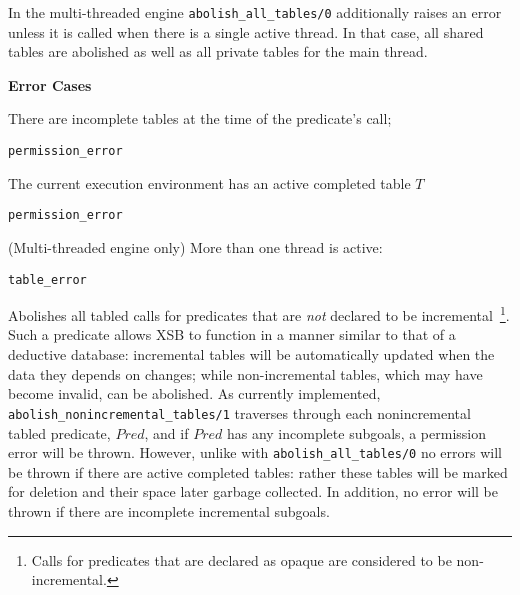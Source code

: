 \begin{description}
\begin{description}
In the multi-threaded engine {\tt abolish\_all\_tables/0} additionally
raises an error unless it is called when there is a single active
thread.  In that case, all shared tables are abolished as well as all
private tables for the main thread.



{\bf Error Cases}
\bi
\item There are incomplete tables at the time of the predicate's call;
\bi
\item 	{\tt permission\_error}
\ei
\item The current execution environment has an active completed table $T$
\bi
\item 	{\tt permission\_error}
\ei
\item (Multi-threaded engine only) More than one thread is active:
\bi
\item 	{\tt table\_error}
\ei
%
%
\ei


%
Abolishes all tabled calls for predicates that are {\em not} declared
to be incremental~\footnote{Calls for predicates that are declared as
opaque are considered to be non-incremental.}.  Such a predicate allows XSB to function in a manner similar
to that of a deductive database: incremental tables will be
automatically updated when the data they depends on changes; while
non-incremental tables, which may have become invalid, can be
abolished.  As currently implemented, {\tt
  abolish\_nonincremental\_tables/1} traverses through each
nonincremental tabled predicate, $Pred$, and if $Pred$ has any
incomplete subgoals, a permission error will be thrown.  However,
unlike with {\tt abolish\_all\_tables/0} no errors will be thrown if
there are active completed tables: rather these tables will be marked
for deletion and their space later garbage collected.  In addition, no
error will be thrown if there are incomplete incremental subgoals.

\end{description}
\end{description}
